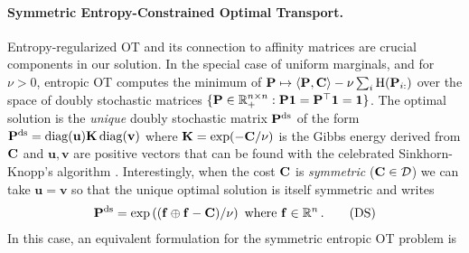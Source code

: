 
\paragraph{Symmetric Entropy-Constrained Optimal Transport.} Entropy-regularized
OT \citep{peyre2019computational} and its connection to affinity
matrices are crucial components in our solution. In the special case of uniform
marginals, and for $\nu > 0$, entropic OT computes the minimum of $\mathbf{P}
\mapsto \langle \mathbf{P}, \mathbf{C} \rangle -\nu \sum_{i} \operatorname{H}(\mathbf{P}_{i:})$
over the space of doubly stochastic matrices $\{\mathbf{P} \in \mathbb{R}_{+}^{n \times n} :
\mathbf{P} \bm{1} = \mathbf{P}^\top \bm{1} =\bm{1}\}$. The optimal solution is the
\emph{unique} doubly stochastic matrix $\mathbf{P}^{\mathrm{ds}}$ of the form $\mathbf{P}^{\mathrm{ds}}=\operatorname{diag}(\mathbf{u})\mathbf{K}
\operatorname{diag}(\mathbf{v})$ where $\mathbf{K} = \exp(-\mathbf{C}/\nu)$ is the Gibbs energy derived from
$\mathbf{C}$ and $\mathbf{u}, \mathbf{v}$ are positive vectors that can be found with
the celebrated Sinkhorn-Knopp’s algorithm \citep{cuturi2013sinkhorn,
sinkhorn1964relationship}. Interestingly, when the cost $\mathbf{C}$ is \emph{symmetric}
(\eg $\mathbf{C} \in \mathcal{D}$) we can take $\mathbf{u} = \mathbf{v}$ \cite[Section
5.2]{idel2016review} so that the unique optimal solution is itself symmetric and writes  
\begin{align}\label{eq:plan_sym_sinkhorn}
    \mathbf{P}^{\mathrm{ds}} = \exp \left((\mathbf{f} \oplus \mathbf{f} - \mathbf{C}) / \nu \right) \text{ where } \mathbf{f} \in \mathbb{R}^n \,.
\tag{DS}
\end{align}
In this case, an equivalent formulation for the symmetric entropic OT problem is
